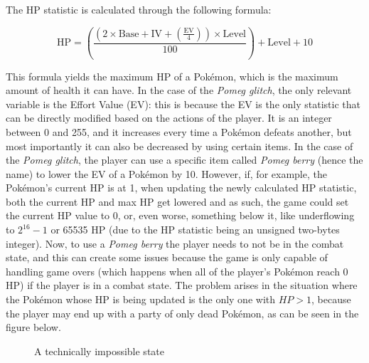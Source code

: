 \documentclass[a4paper]{usiinfbachelorproject}
\begin{document}
The HP statistic is calculated through the following formula:

\begin{equation}
	\text{HP} = \left( \frac{(2 \times \text{Base} + \text{IV} + \left( \frac{\text{EV}}{4} \right)) \times \text{Level}}{100} \right) + \text{Level} + 10
	\label{eq:pokemon_hp_formula}
\end{equation}

This formula yields the maximum HP of a Pokémon, which is the maximum amount of health it can have. In the case of the \textit{Pomeg glitch}, the only relevant variable is the Effort Value (EV): this is because the EV is the only statistic that can be directly modified based on the actions of the player. It is an integer between 0 and 255, and it increases every time a Pokémon defeats another, but most importantly it can also be decreased by using certain items. In the case of the \textit{Pomeg glitch}, the player can use a specific item called \textit{Pomeg berry} (hence the name) to lower the EV of a Pokémon by 10. However, if, for example, the Pokémon's current HP is at 1, when updating the newly calculated HP statistic, both the current HP and max HP get lowered and as such, the game could set the current HP value to 0, or, even worse, something below it, like underflowing to $ 2^{16}-1$ or 65535 HP (due to the HP statistic being an unsigned two-bytes integer). Now, to use a \textit{Pomeg berry} the player needs to not be in the combat state, and this can create some issues because the game is only capable of handling game overs (which happens when all of the player's Pokémon reach 0 HP) if the player is in a combat state. The problem arises in the situation where the Pokémon whose HP is being updated is the only one with $HP > 1$, because the player may end up with a party of only dead Pokémon, as can be seen in the figure below.

\begin{figure}[h!]
	\caption{A technically impossible state}\label{fig:dead_team}
\end{figure}
\end{document}
